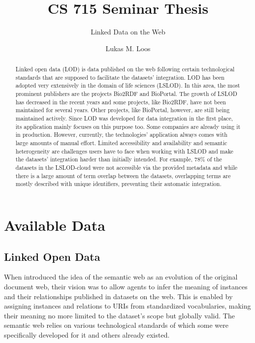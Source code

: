 \documentclass[runningheads]{llncs}
\begin{document}
%
    \title{CS 715 Seminar Thesis}
    \subtitle{Linked Data on the Web}
%
%
    \author{Lukas M. Loos}
%
%
%
    \maketitle              %
%
    \begin{abstract}
        Linked open data (LOD) is data published on the web following certain technological standards that are supposed to facilitate the datasets' integration.
        LOD has been adopted very extensively in the domain of life sciences (LSLOD).
        In this area, the most prominent publishers are the projects Bio2RDF and BioPortal.
        The growth of LSLOD has decreased in the recent years and some projects, like Bio2RDF, have not been maintained for several years.
        Other projects, like BioPortal, however, are still being maintained actively.
        Since LOD was developed for data integration in the first place, its application mainly focuses on this purpose too.
        Some companies are already using it in production.
        However, currently, the technologies' application always comes with large amounts of manual effort.
        Limited accessibility and availability and semantic heterogeneity are challenges users have to face when working with LSLOD and make the datasets' integration harder than initially intended.
        For example, $78\%$ of the datasets in the LSLOD-cloud were not accessible via the provided metadata and while there is a large amount of term overlap between the datasets, overlapping terms are mostly described with unique identifiers, preventing their automatic integration.

    \end{abstract}


    \section{Available Data}

    \subsection{Linked Open Data}
    When \citet{berners2001semantic} introduced the idea of the semantic web as an evolution of the original document web, their vision was to allow agents to infer the meaning of instances and their relationships published in datasets on the web.
    This is enabled by assigning instances and relations to URIs from standardized vocabularies, making their meaning no more limited to the dataset's scope but globally valid.
    The semantic web relies on various technological standards of which some were specifically developed for it and others already existed.
\end{document}

